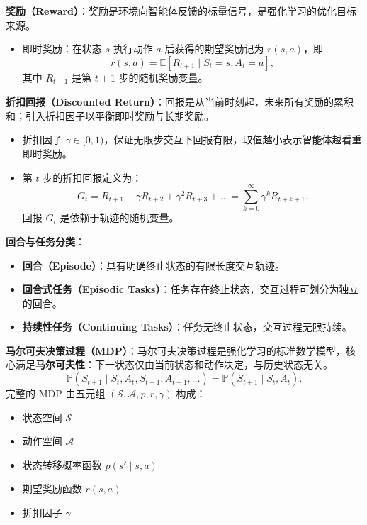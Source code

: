 \documentclass[UTF8]{article}
\begin{document}
\begin{definitionbox}
  \textbf{奖励（Reward）}：奖励是环境向智能体反馈的标量信号，是强化学习的优化目标来源。
  \begin{itemize}
    \item 即时奖励：在状态 $s$ 执行动作 $a$ 后获得的期望奖励记为 $r(s,a)$，即
    \[
      r(s,a) = \mathbb{E}\left[ R_{t+1} \mid S_t=s, A_t=a \right],
    \]
    其中 $R_{t+1}$ 是第 $t+1$ 步的随机奖励变量。
  \end{itemize}
\end{definitionbox}

\begin{definitionbox}
  \textbf{折扣回报（Discounted Return）}：回报是从当前时刻起，未来所有奖励的累积和；引入折扣因子以平衡即时奖励与长期奖励。
  \begin{itemize}
    \item 折扣因子 $\gamma \in [0,1)$，保证无限步交互下回报有限，取值越小表示智能体越看重即时奖励。
    \item 第 $t$ 步的折扣回报定义为：
    \[
      G_t = R_{t+1} + \gamma R_{t+2} + \gamma^2 R_{t+3} + \dots = \sum_{k=0}^{\infty} \gamma^k R_{t+k+1}.
    \]
    回报 $G_t$ 是依赖于轨迹的随机变量。
  \end{itemize}
\end{definitionbox}

\begin{definitionbox}
  \textbf{回合与任务分类}：
  \begin{itemize}
    \item \textbf{回合（Episode）}：具有明确终止状态的有限长度交互轨迹。
    \item \textbf{回合式任务（Episodic Tasks）}：任务存在终止状态，交互过程可划分为独立的回合。
    \item \textbf{持续性任务（Continuing Tasks）}：任务无终止状态，交互过程无限持续。
  \end{itemize}
\end{definitionbox}

\begin{definitionbox}
  \textbf{马尔可夫决策过程（MDP）}：马尔可夫决策过程是强化学习的标准数学模型，核心满足\textbf{马尔可夫性}：下一状态仅由当前状态和动作决定，与历史状态无关。
  \[
    \mathbb{P}(S_{t+1} \mid S_t, A_t, S_{t-1}, A_{t-1}, \dots) = \mathbb{P}(S_{t+1} \mid S_t, A_t).
  \]
  完整的 MDP 由五元组 $(\mathcal{S}, \mathcal{A}, p, r, \gamma)$ 构成：
  \begin{itemize}
    \item 状态空间 $\mathcal{S}$
    \item 动作空间 $\mathcal{A}$
    \item 状态转移概率函数 $p(s' \mid s,a)$
    \item 期望奖励函数 $r(s,a)$
    \item 折扣因子 $\gamma$
  \end{itemize}
\end{definitionbox}
\end{document}
